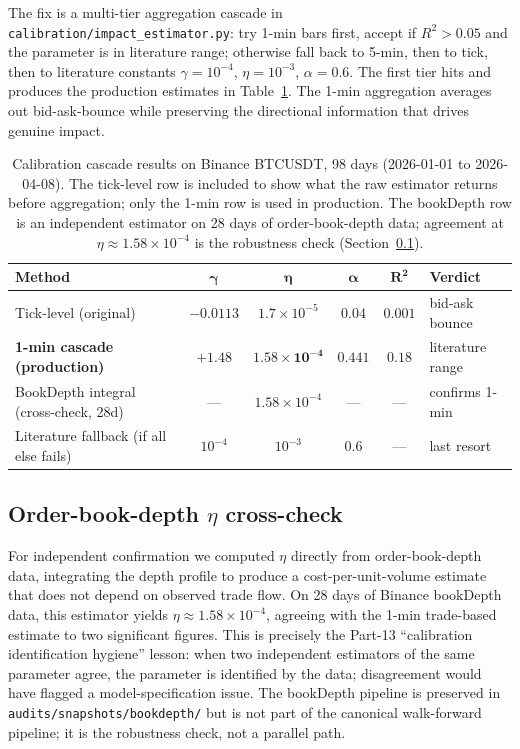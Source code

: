 \documentclass[11pt,letterpaper]{article}
\begin{document}
The fix is a multi-tier aggregation cascade in \texttt{calibration/impact\_estimator.py}: try 1-min bars first, accept if \(R^2>0.05\) and the parameter is in literature range; otherwise fall back to 5-min, then to tick, then to literature constants \(\gamma=10^{-4}\), \(\eta=10^{-3}\), \(\alpha=0.6\). The first tier hits and produces the production estimates in Table~\ref{tab:calib}. The 1-min aggregation averages out bid-ask-bounce while preserving the directional information that drives genuine impact.

\begin{table}[!htb]
\centering
\caption{Calibration cascade results on Binance BTCUSDT, 98 days (2026-01-01 to 2026-04-08). The tick-level row is included to show what the raw estimator returns before aggregation; only the 1-min row is used in production. The bookDepth row is an independent estimator on 28 days of order-book-depth data; agreement at \(\eta\approx 1.58\!\times\!10^{-4}\) is the robustness check (Section~\ref{sec:bookdepth}).}
\label{tab:calib}
\small
\begin{tabular}{l c c c c l}
\toprule
\textbf{Method} & \(\bm\gamma\) & \(\bm\eta\) & \(\bm\alpha\) & \(\bm{R^2}\) & \textbf{Verdict} \\
\midrule
Tick-level (original) & \(-0.0113\) & \(1.7\!\times\!10^{-5}\) & \(0.04\) & \(0.001\) & bid-ask bounce \\
\textbf{1-min cascade (production)} & \(\bm{+1.48}\) & \(\bm{1.58\!\times\!10^{-4}}\) & \(\bm{0.441}\) & \(\bm{0.18}\) & literature range \\
BookDepth integral (cross-check, 28d) & --- & \(1.58\!\times\!10^{-4}\) & --- & --- & confirms 1-min \\
Literature fallback (if all else fails) & \(10^{-4}\) & \(10^{-3}\) & \(0.6\) & --- & last resort \\
\bottomrule
\end{tabular}
\end{table}

\subsection{Order-book-depth \(\eta\) cross-check}
\label{sec:bookdepth}

For independent confirmation we computed \(\eta\) directly from order-book-depth data, integrating the depth profile to produce a cost-per-unit-volume estimate that does not depend on observed trade flow. On 28 days of Binance bookDepth data, this estimator yields \(\eta\approx 1.58\!\times\!10^{-4}\), agreeing with the 1-min trade-based estimate to two significant figures. This is precisely the Part-13 ``calibration identification hygiene'' lesson: when two independent estimators of the same parameter agree, the parameter is identified by the data; disagreement would have flagged a model-specification issue. The bookDepth pipeline is preserved in \texttt{audits/snapshots/bookdepth/} but is not part of the canonical walk-forward pipeline; it is the robustness check, not a parallel path.
\end{document}
